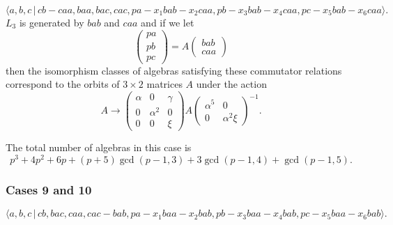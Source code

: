 \documentclass[10pt]{article}
\begin{document}
\begin{equation}
\langle
a,b,c\,|%
\,cb-caa,baa,bac,cac,pa-x_{1}bab-x_{2}caa,pb-x_{3}bab-x_{4}caa,pc-x_{5}bab-x_{6}caa\rangle .
\tag{7.764}
\end{equation}%
$L_{3}$ is generated by $bab$ and $caa$ and if we let 
\[
\left( 
\begin{array}{l}
pa \\ 
pb \\ 
pc%
\end{array}%
\right) =A\left( 
\begin{array}{l}
bab \\ 
caa%
\end{array}%
\right) 
\]%
then the isomorphism classes of algebras satisfying these commutator
relations correspond to the orbits of $3\times 2$ matrices $A$ under the
action 
\[
A\rightarrow \left( 
\begin{array}{lll}
\alpha & 0 & \gamma \\ 
0 & \alpha ^{2} & 0 \\ 
0 & 0 & \xi%
\end{array}%
\right) A\left( 
\begin{array}{ll}
\alpha ^{5} & 0 \\ 
0 & \alpha ^{2}\xi%
\end{array}%
\right) ^{-1}. 
\]%
$\allowbreak $

The total number of algebras in this case is 
\[
p^3+4p^2+6p+(p+5)\gcd (p-1,3)+3\gcd (p-1,4)+\gcd (p-1,5). 
\]

\subsubsection{Cases 9 and 10}

\begin{equation}
\langle
a,b,c\,|%
\,cb,bac,caa,cac-bab,pa-x_{1}baa-x_{2}bab,pb-x_{3}baa-x_{4}bab,pc-x_{5}baa-x_{6}bab\rangle .
\tag{7.765}
\end{equation}
\end{document}
